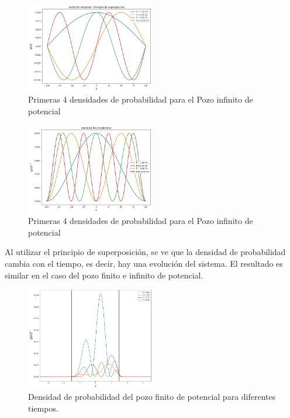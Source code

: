 \documentclass[a4paper]{article}
\theoremstyle{definition}
\theoremstyle{plain}
\begin{document}
\begin{figure}
\begin {center}
\includegraphics[width=0.50\textwidth]{infiniteWallPsi.png}
\caption{Primeras 4 densidades de probabilidad para el Pozo infinito de potencial}
\label{fig:infiniteWelldensity}
\end {center}
\end{figure}

\begin{figure}
\begin {center}
\includegraphics[width=0.50\textwidth]{InfiniteWallDensity.png}
\caption{Primeras 4 densidades de probabilidad para el Pozo infinito de potencial}
\label{fig:infiniteWelldensity}
\end {center}
\end{figure}

Al utilizar el principio de superposición, se ve que la densidad de probabilidad cambia con el tiempo, es decir, hay una evolución del sistema. El resultado es similar en el caso del pozo finito e infinito de potencial.

\begin{figure}
\begin {center}
\includegraphics[width=0.50\textwidth]{finiteTemp.png}
\caption{Densidad de probabilidad del pozo finito de potencial para diferentes
tiempos.}
\label{fig:finiteTemp}
\end {center}
\end{figure}
\end{document}
